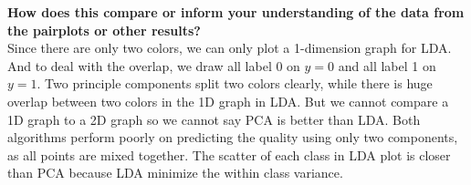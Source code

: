 \documentclass[12pt]{article}
\begin{document}
\begin{figure}[H]
\captionsetup[subfigure]{labelformat=empty}
\centering
{}
\end{figure}
\noindent
\textbf{How does this compare or inform your understanding of the data from the pairplots or other results?}\\
Since there are only two colors, we can only plot a 1-dimension graph for LDA. And to deal with the overlap, we draw all label 0 on $y=0$ and all label 1 on $y=1$. Two principle components split two colors clearly, while there is huge overlap between two colors in the 1D graph in LDA. But we cannot compare a 1D graph to a 2D graph so we cannot say PCA is better than LDA. Both algorithms perform poorly on predicting the quality using only two components, as all points are mixed together. The scatter of each class in LDA plot is closer than PCA because LDA minimize the within class variance.
\end{document}
